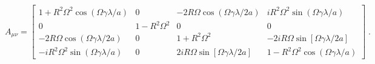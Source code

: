 \begin{equation}
A_{\mu \nu} =
\left[
 \begin{array}{cccc}
 1+R^2\Omega^2\cos(\Omega\gamma\lambda/a) & 0 & 
                              -2R\Omega\cos(\Omega\gamma\lambda/2a) & 
                                     iR^2\Omega^2\sin(\Omega\gamma\lambda/a)\\
 0 & 1-R^2\Omega^2 & 0 & 0\\
 -2R\Omega \cos (\Omega \gamma \lambda/2 a) & 0 &  
                              1+R^2\Omega^2 & 
                                     -2iR\Omega\sin[\Omega\gamma\lambda/2a]\\
 -iR^2\Omega^2\sin(\Omega\gamma\lambda/a) & 0 & 
                              2iR\Omega\sin[\Omega\gamma\lambda/2a] &   
                                     1-R^2\Omega^2 \cos(\Omega \gamma \lambda/a)
 \end{array} 
\right] \; .
\label{Afin}
\end{equation}

